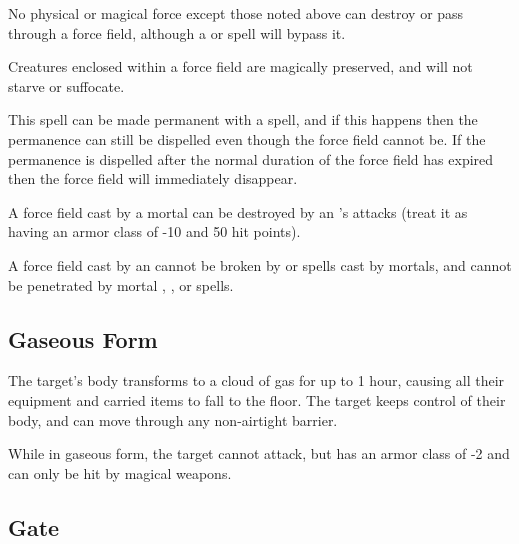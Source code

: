 \begin{multicols*}{2}
No physical or magical force except those noted above can destroy or pass through a force field, although a  or  spell will bypass it.

Creatures enclosed within a force field are magically preserved, and will not starve or suffocate.

This spell can be made permanent with a  spell, and if this happens then the permanence can still be dispelled even though the force field cannot be. If the permanence is dispelled after the normal duration of the force field has expired then the force field will immediately disappear.

A force field cast by a mortal can be destroyed by an ’s attacks (treat it as having an armor class of -10 and 50 hit points).

A force field cast by an  cannot be broken by  or  spells cast by mortals, and cannot be penetrated by mortal , , or  spells.

\subsection{Gaseous Form}\label{spell:Gaseous Form}

The target’s body transforms to a cloud of gas for up to 1 hour, causing all their equipment and carried items to fall to the floor. The target keeps control of their body, and can move through any non-airtight barrier.

While in gaseous form, the target cannot attack, but has an armor class of -2 and can only be hit by magical weapons.

\subsection{Gate}\label{spell:Gate}
\end{multicols*}
